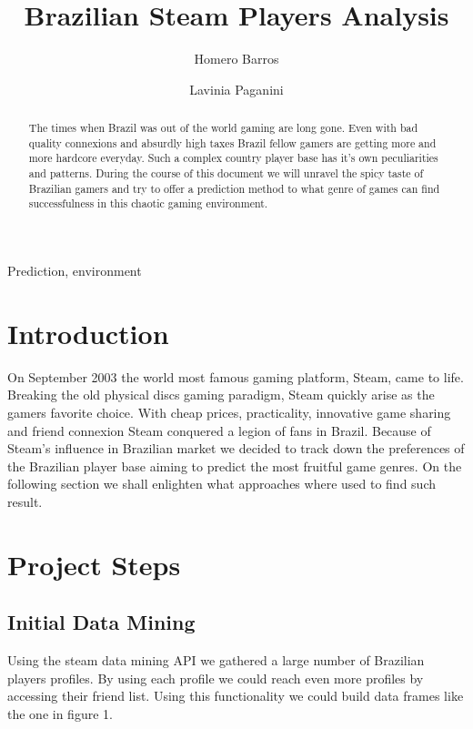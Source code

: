 \documentclass[review]{elsarticle}
\begin{document}
\begin{frontmatter}

\title{Brazilian Steam Players Analysis}


\author{Homero Barros}

\author{Lavinia Paganini}


\begin{abstract}
The times when Brazil was out of the world gaming are long gone. Even with bad quality connexions and absurdly high taxes Brazil fellow gamers are getting more and more hardcore everyday. Such a complex country player base has it's own peculiarities and patterns. During the course of this document we will unravel the spicy taste of Brazilian gamers and try to offer a prediction method to what genre of games can find successfulness in this chaotic gaming environment.  
\end{abstract}

\begin{keyword}
Prediction, environment 
\end{keyword}

\end{frontmatter}

\linenumbers

\section{Introduction}

On September 2003 the world most famous gaming platform, Steam, came to life. Breaking the old physical discs gaming paradigm, Steam quickly arise as the gamers favorite choice. With cheap prices, practicality, innovative game sharing and friend connexion Steam conquered a legion of fans in Brazil. Because of Steam's influence in Brazilian market we decided to track down the preferences of the Brazilian player base aiming to predict the most fruitful game genres. On the following section we shall enlighten what approaches where used to find such result. 


\section{Project Steps}
\subsection{Initial Data Mining}
Using the steam data mining API we gathered a large number of Brazilian players profiles. By using each profile we could reach even more profiles by accessing their friend list. Using this functionality we could build data frames like the one in figure 1.
\end{document}
